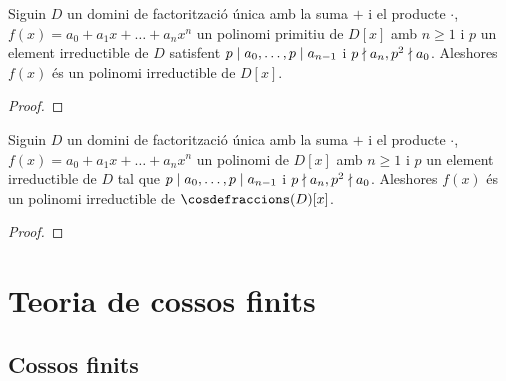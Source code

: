 \documentclass[../Apunts.tex]{subfiles}
\begin{document}
	\begin{theorem}
		\label{thm:Criteri d'Eisenstein}
		Siguin \(D\) un domini de factorització única amb la suma \(+\) i el producte \(\cdot\), \(f(x)=a_{0}+a_{1}x+\dots+a_{n}x^{n}\) un polinomi primitiu de \(D[x]\) amb \(n\geq1\) i \(p\) un element irreductible de \(D\) satisfent \(p\mathrel{|} a_{0},\dots,p\mathrel{|} a_{n-1}\) i \(p\mathrel{\nmid} a_{n},p^{2}\mathrel{\nmid} a_{0}\). Aleshores \(f(x)\) és un polinomi irreductible de \(D[x]\).
		\begin{proof}
		\end{proof}
	\end{theorem}
	\begin{corollary}
		Siguin \(D\) un domini de factorització única amb la suma \(+\) i el producte \(\cdot\), \(f(x)=a_{0}+a_{1}x+\dots+a_{n}x^{n}\) un polinomi de \(D[x]\) amb \(n\geq1\) i \(p\) un element irreductible de \(D\) tal que \(p\mathrel{|} a_{0},\dots,p\mathrel{|} a_{n-1}\) i \(p\mathrel{\nmid} a_{n},p^{2}\mathrel{\nmid} a_{0}\). Aleshores \(f(x)\) és un polinomi irreductible de \(\cosdefraccions(D)[x]\).
		\begin{proof}
		\end{proof}
	\end{corollary}
	\chapter{Teoria de cossos finits}
	\section{Cossos finits}
\end{document}
